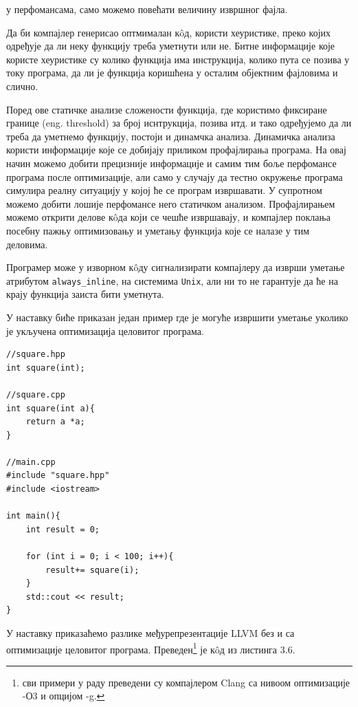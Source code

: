\documentclass[12pt,oneside]{memoir}
\begin{document}
у перфомансама, само можемо повећати величину извршног фајла.
\par
Да би компајлер генерисао оптмималан к\^{o}д, користи хеуристике, преко којих одређује
да ли неку функцију треба уметнути или не.
Битне информације које користе хеуристике су колико функција има инструкција,
колико пута се позива у току програма, да ли је функција коришћена у осталим
објектним фајловима и слично.
\par
Поред ове статичке анализе сложености функција, где користимо фиксиране границе (eng. threshold)
за број иснтрукција, позива итд. и тако одређујемо да ли треба да уметнемо функцију,
постоји и динамчка анализа.
Динамичка анализа користи информације које се добијају приликом профајлирања програма.
На овај начин можемо добити прецизније информације и самим тим боље перфомансе програма после оптимизације,
али само у случају да тестно окружење програма симулира реалну ситуацију у којој
ће се програм извршавати.
У супротном можемо добити лошије перфомансе него статичком анализом.
Профајлирањем можемо открити делове к\^{o}да који се чешће извршавају, и компајлер 
поклања посебну пажњу оптимизовању и уметању функција које се налазе у тим деловима.

Програмер може у изворном  к\^{o}ду сигнализирати компајлеру да изврши уметање
атрибутом \texttt {always{\_}inline}, на системима \texttt{Unix}, али ни то не гарантује да ће на крају
функција заиста бити уметнута.
\par
У наставку биће приказан један пример где је могуће извршити уметање уколико
је укључена оптимизација целовитог програма.

\begin{lstlisting}[frame=single,caption={Primer umetanja funkcije}, captionpos=b]
//square.hpp           
int square(int);         
    					
//square.cpp				
int square(int a){
    return a *a;
}

//main.cpp
#include "square.hpp"
#include <iostream>

int main(){
    int result = 0;
    
    for (int i = 0; i < 100; i++){
        result+= square(i);
    }
    std::cout << result;
}

\end{lstlisting}

У наставку приказаћемо разлике међурепрезентације LLVM без и са оптимизације
целовитог програма. Преведен\footnote{сви примери у раду преведени су компајлером Clang са нивоом оптимизације -О3 и опцијом -g.} је к\^{o}д из листинга 3.6.
\end{document}
